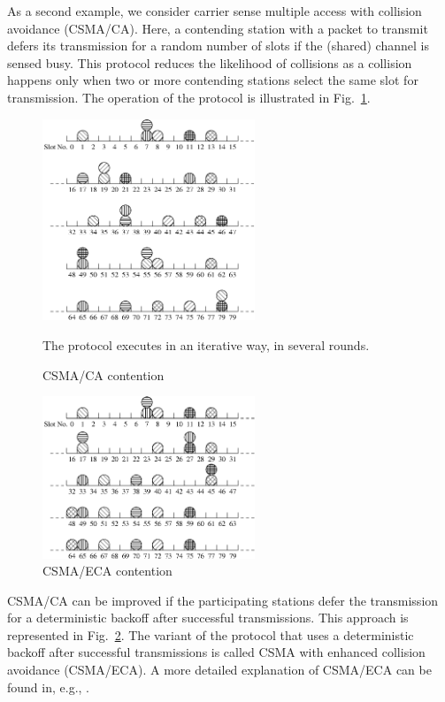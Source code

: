 \documentclass[journal]{IEEEtran}
\begin{document}
As a second example, we consider carrier sense multiple access with collision avoidance (CSMA/CA). Here, a contending station with a packet to transmit defers its transmission for a random number of slots if the (shared) channel is sensed busy.
This protocol reduces the likelihood of collisions as a collision happens only when two or more contending stations select the same slot for transmission.
The operation of the protocol is illustrated in Fig.~\ref{fig:csma_ca_compact}.

\begin{figure}
  \centering
  \includegraphics[width=2.5in]{figures/csma_ca_compact}
  \caption{CSMA/CA contention}
  \label{fig:csma_ca_compact}
  The protocol executes in an iterative way, in several rounds.
\end{figure}
\begin{figure}
  \centering
  \includegraphics[width=2.5in]{figures/csma_eca_compact}
  \caption{CSMA/ECA contention}
  \label{fig:csma_eca_compact}
\end{figure}

CSMA/CA can be improved if the participating stations defer the transmission for a deterministic backoff after successful transmissions.
This approach is represented in Fig.~\ref{fig:csma_eca_compact}.
The variant of the protocol that uses a deterministic backoff after successful transmissions is called CSMA with enhanced collision avoidance (CSMA/ECA).
A more detailed explanation of CSMA/ECA can be found in, e.g., \cite{barcelo2008lba,barcelo2009tpc,he2009srb,fang2011dlm}.
\end{document}
